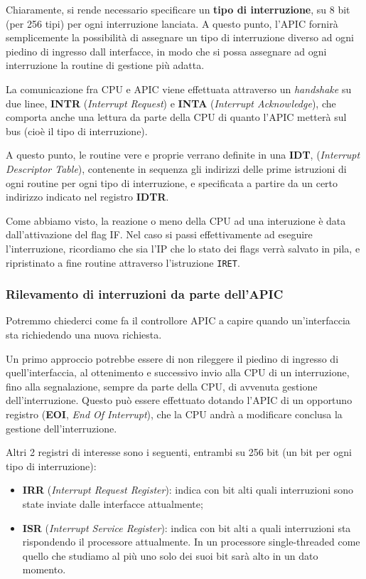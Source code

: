 \documentclass[a4paper,11pt]{article}
\begin{document}
Chiaramente, si rende necessario specificare un \textbf{tipo di interruzione}, su 8 bit (per 256 tipi) per ogni interruzione lanciata.
A questo punto, l'APIC fornirà semplicemente la possibilità di assegnare un tipo di interruzione diverso ad ogni piedino di ingresso dall interfacce, in modo che si possa assegnare ad ogni interruzione la routine di gestione più adatta.

La comunicazione fra CPU e APIC viene effettuata attraverso un \textit{handshake} su due linee, \textbf{INTR} (\textit{Interrupt Request}) e \textbf{INTA} (\textit{Interrupt Acknowledge}), che comporta anche una lettura da parte della CPU di quanto l'APIC metterà sul bus (cioè il tipo di interruzione).

A questo punto, le routine vere e proprie verrano definite in una \textbf{IDT}, (\textit{Interrupt Descriptor Table}), contenente in sequenza gli indirizzi delle prime istruzioni di ogni routine per ogni tipo di interruzione, e specificata a partire da un certo indirizzo indicato nel registro \textbf{IDTR}.

Come abbiamo visto, la reazione o meno della CPU ad una interuzione è data dall'attivazione del flag IF.
Nel caso si passi effettivamente ad eseguire l'interruzione, ricordiamo che sia l'IP che lo stato dei flags verrà salvato in pila, e ripristinato a fine routine attraverso l'istruzione \lstinline|IRET|.

\subsubsection{Rilevamento di interruzioni da parte dell'APIC}
Potremmo chiederci come fa il controllore APIC a capire quando un'interfaccia sta richiedendo una nuova richiesta.

Un primo approccio potrebbe essere di non rileggere il piedino di ingresso di quell'interfaccia, al ottenimento e successivo invio alla CPU di un interruzione, fino alla segnalazione, sempre da parte della CPU, di avvenuta gestione dell'interruzione.
Questo può essere effettuato dotando l'APIC di un opportuno registro (\textbf{EOI}, \textit{End Of Interrupt}), che la CPU andrà a modificare conclusa la gestione dell'interruzione.

Altri 2 registri di interesse sono i seguenti, entrambi su 256 bit (un bit per ogni tipo di interruzione):
\begin{itemize}
	\item \textbf{IRR} (\textit{Interrupt Request Register}): indica con bit alti quali interruzioni sono state inviate dalle interfacce attualmente;
	\item \textbf{ISR} (\textit{Interrupt Service Register}): indica con bit alti a quali interruzioni sta rispondendo il processore attualmente. In un processore single-threaded come quello che studiamo al più uno solo dei suoi bit sarà alto in un dato momento.
\end{itemize}
\end{document}
